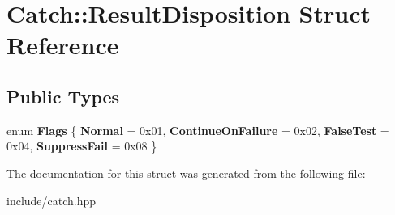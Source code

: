 \hypertarget{structCatch_1_1ResultDisposition}{}\section{Catch\+:\+:Result\+Disposition Struct Reference}
\label{structCatch_1_1ResultDisposition}
\subsection*{Public Types}
\begin{DoxyCompactItemize}
\item 
enum {\bfseries Flags} \{ {\bfseries Normal} = 0x01, 
{\bfseries Continue\+On\+Failure} = 0x02, 
{\bfseries False\+Test} = 0x04, 
{\bfseries Suppress\+Fail} = 0x08
 \}\hypertarget{structCatch_1_1ResultDisposition_a3396cad6e2259af326b3aae93e23e9d8}{}\label{structCatch_1_1ResultDisposition_a3396cad6e2259af326b3aae93e23e9d8}

\end{DoxyCompactItemize}


The documentation for this struct was generated from the following file\+:\begin{DoxyCompactItemize}
\item 
include/catch.\+hpp\end{DoxyCompactItemize}
